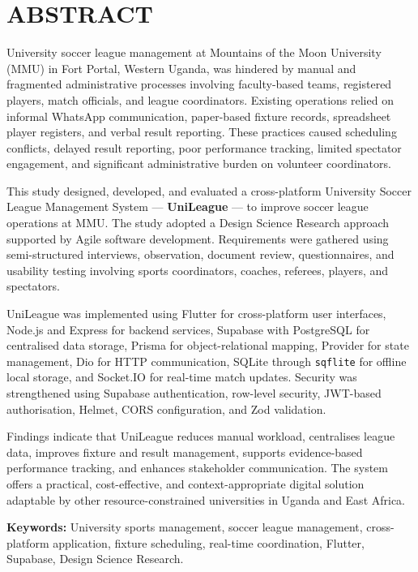 \documentclass[12pt,a4paper]{report}
\begin{document}
\newpage\chapter*{ABSTRACT}
University soccer league management at Mountains of the Moon University (MMU) in Fort Portal,
Western Uganda, was hindered by manual and fragmented administrative processes involving faculty-based
teams, registered players, match officials, and league coordinators. Existing operations relied on
informal WhatsApp communication, paper-based fixture records, spreadsheet player registers, and verbal
result reporting. These practices caused scheduling conflicts, delayed result reporting, poor performance
tracking, limited spectator engagement, and significant administrative burden on volunteer coordinators.

This study designed, developed, and evaluated a cross-platform University Soccer League Management
System --- \textbf{UniLeague} --- to improve soccer league operations at MMU. The study adopted a
Design Science Research approach supported by Agile software development. Requirements were gathered
using semi-structured interviews, observation, document review, questionnaires, and usability testing
involving sports coordinators, coaches, referees, players, and spectators.

UniLeague was implemented using Flutter for cross-platform user interfaces, Node.js and Express for
backend services, Supabase with PostgreSQL for centralised data storage, Prisma for object-relational
mapping, Provider for state management, Dio for HTTP communication, SQLite through \texttt{sqflite}
for offline local storage, and Socket.IO for real-time match updates. Security was strengthened using
Supabase authentication, row-level security, JWT-based authorisation, Helmet, CORS configuration,
and Zod validation.

Findings indicate that UniLeague reduces manual workload, centralises league data, improves fixture
and result management, supports evidence-based performance tracking, and enhances stakeholder
communication. The system offers a practical, cost-effective, and context-appropriate digital solution
adaptable by other resource-constrained universities in Uganda and East Africa.

\vspace{0.4cm}
\noindent\textbf{Keywords:} University sports management, soccer league management, cross-platform
application, fixture scheduling, real-time coordination, Flutter, Supabase, Design Science Research.
\end{document}
